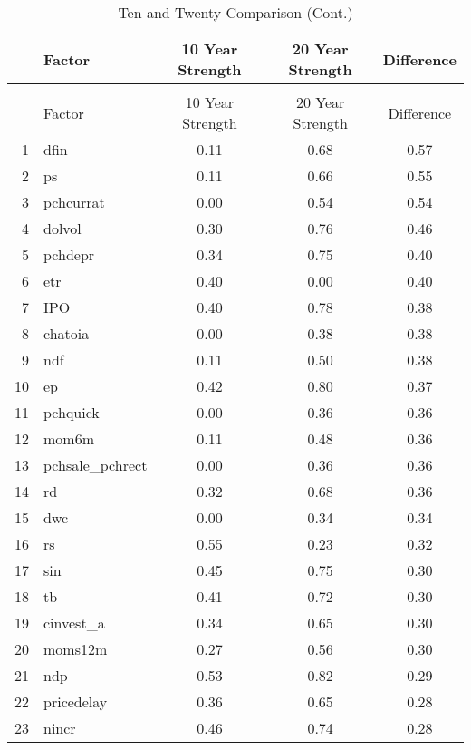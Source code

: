 \documentclass[12pt]{article}
\begin{document}
\begin{footnotesize}
	\setlength{\tabcolsep}{2pt}
	\singlespacing
	\centering					
	\begin{longtable}{rl|c|c|c}
		\caption{Ten and Twenty Comparison}\\
		
		\hline
		\hline
		& Factor & 10 Year Strength & 20 Year Strength & Difference \\ 
		\hline
		\endfirsthead
		
		\caption{Ten and Twenty Comparison (Cont.)}\\
		\hline
		\hline
		& Factor & 10 Year Strength & 20 Year Strength & Difference \\
		\hline
		\endhead
		
		\hline\hline
		\endfoot
		
		1 & dfin & 0.11 & 0.68 & 0.57 \\ 
  2 & ps & 0.11 & 0.66 & 0.55 \\ 
  3 & pchcurrat & 0.00 & 0.54 & 0.54 \\ 
  4 & dolvol & 0.30 & 0.76 & 0.46 \\ 
  5 & pchdepr & 0.34 & 0.75 & 0.40 \\ 
  6 & etr & 0.40 & 0.00 & 0.40 \\ 
  7 & IPO & 0.40 & 0.78 & 0.38 \\ 
  8 & chatoia & 0.00 & 0.38 & 0.38 \\ 
  9 & ndf & 0.11 & 0.50 & 0.38 \\ 
  10 & ep & 0.42 & 0.80 & 0.37 \\ 
  11 & pchquick & 0.00 & 0.36 & 0.36 \\ 
  12 & mom6m & 0.11 & 0.48 & 0.36 \\ 
  13 & pchsale\_pchrect & 0.00 & 0.36 & 0.36 \\ 
  14 & rd & 0.32 & 0.68 & 0.36 \\ 
  15 & dwc & 0.00 & 0.34 & 0.34 \\ 
  16 & rs & 0.55 & 0.23 & 0.32 \\ 
  17 & sin & 0.45 & 0.75 & 0.30 \\ 
  18 & tb & 0.41 & 0.72 & 0.30 \\ 
  19 & cinvest\_a & 0.34 & 0.65 & 0.30 \\ 
  20 & moms12m & 0.27 & 0.56 & 0.30 \\ 
  21 & ndp & 0.53 & 0.82 & 0.29 \\ 
  22 & pricedelay & 0.36 & 0.65 & 0.28 \\ 
  23 & nincr & 0.46 & 0.74 & 0.28 \\ 

\end{longtable}
\end{footnotesize}
\end{document}
